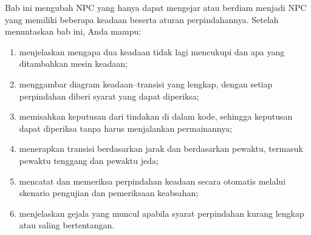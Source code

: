 \begin{tujuanbox}
Bab ini mengubah NPC yang hanya dapat mengejar atau berdiam menjadi NPC yang
memiliki beberapa keadaan beserta aturan perpindahannya. Setelah menuntaskan
bab ini, Anda mampu:
\begin{enumerate}
  \item menjelaskan mengapa dua keadaan tidak lagi mencukupi dan apa yang
        ditambahkan mesin keadaan;
  \item menggambar diagram keadaan--transisi yang lengkap, dengan setiap
        perpindahan diberi syarat yang dapat diperiksa;
  \item memisahkan keputusan dari tindakan di dalam kode, sehingga keputusan
        dapat diperiksa tanpa harus menjalankan permainannya;
  \item menerapkan transisi berdasarkan jarak dan berdasarkan pewaktu, termasuk
        pewaktu tenggang dan pewaktu jeda;
  \item mencatat dan memeriksa perpindahan keadaan secara otomatis melalui
        skenario pengujian dan pemeriksaan keabsahan;
  \item menjelaskan gejala yang muncul apabila syarat perpindahan kurang lengkap
        atau saling bertentangan.
\end{enumerate}
\end{tujuanbox}
